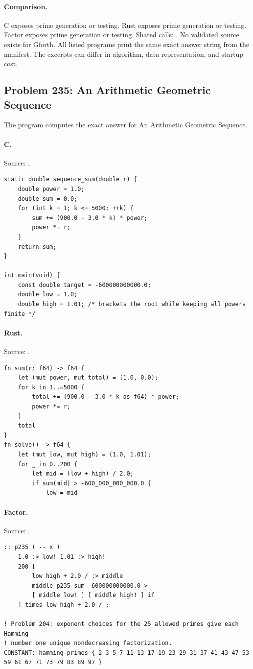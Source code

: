 \paragraph{Comparison.}
C exposes prime generation or testing. Rust exposes prime generation or testing. Factor exposes prime generation or testing. Shared calls: \texttt{}.
No validated source exists for Gforth.
All listed programs print the same exact answer string from the manifest. The excerpts can differ in algorithm, data representation, and startup cost.

\subsection{Problem 235: An Arithmetic Geometric Sequence}
\label{walkthrough:p235}
The program computes the exact answer for An Arithmetic Geometric Sequence.

\paragraph{C.} Source: .
\begin{lstlisting}
static double sequence_sum(double r) {
    double power = 1.0;
    double sum = 0.0;
    for (int k = 1; k <= 5000; ++k) {
        sum += (900.0 - 3.0 * k) * power;
        power *= r;
    }
    return sum;
}

int main(void) {
    const double target = -600000000000.0;
    double low = 1.0;
    double high = 1.01; /* brackets the root while keeping all powers finite */
\end{lstlisting}

\paragraph{Rust.} Source: .
\begin{lstlisting}
fn sum(r: f64) -> f64 {
    let (mut power, mut total) = (1.0, 0.0);
    for k in 1..=5000 {
        total += (900.0 - 3.0 * k as f64) * power;
        power *= r;
    }
    total
}
fn solve() -> f64 {
    let (mut low, mut high) = (1.0, 1.01);
    for _ in 0..200 {
        let mid = (low + high) / 2.0;
        if sum(mid) > -600_000_000_000.0 {
            low = mid
\end{lstlisting}

\paragraph{Factor.} Source: .
\begin{lstlisting}
:: p235 ( -- x )
    1.0 :> low! 1.01 :> high!
    200 [
        low high + 2.0 / :> middle
        middle p235-sum -600000000000.0 >
        [ middle low! ] [ middle high! ] if
    ] times low high + 2.0 / ;

! Problem 204: exponent choices for the 25 allowed primes give each Hamming
! number one unique nondecreasing factorization.
CONSTANT: hamming-primes { 2 3 5 7 11 13 17 19 23 29 31 37 41 43 47 53 59 61 67 71 73 79 83 89 97 }
\end{lstlisting}

